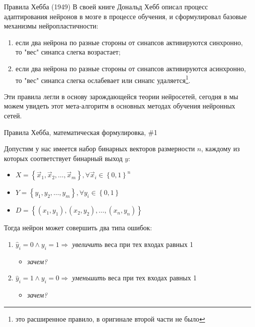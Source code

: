 \documentclass[10pt]{beamer}
\begin{document}
\begin{frame}{Правила Хебба (1949)}
В своей книге Дональд Хебб описал процесс адаптирования нейронов в мозге в процессе обучения, и сформулировал базовые механизмы нейропластичности:
\begin{enumerate}
	\item если два нейрона по разные стороны от синапсов активируются синхронно, то "вес" синапса слегка возрастает;
	\item если два нейрона по разные стороны от синапсов активируются асинхронно, то "вес" синапса слегка ослабевает или синапс удаляется\footnote{это расширенное правило, в оригинале второй части не было}.
\end{enumerate}
Эти правила легли в основу зарождающейся теории нейросетей, сегодня в мы можем увидеть этот мета-алгоритм в основных методах обучения нейронных сетей.

\end{frame}


\begin{frame}{Правила Хебба, математическая формулировка, \#1}

Допустим у нас имеется набор бинарных векторов размерности $n$, каждому из которых соответствует бинарный выход $y$:
\begin{itemize}
	\item $X = \left\{\vec x_1, \vec x_2, \ldots, \vec x_m\right\}, \forall \vec x_i \in \left\{0, 1\right\}^n$
	\item $Y = \left\{y_1, y_2, \ldots, y_m\right\}, \forall y_i \in \left\{0, 1\right\}$
	\item $D = \left\{ \left(x_1, y_1\right), \left(x_2, y_2\right), \ldots, \left(x_n, y_n\right) \right\}$
\end{itemize}
Тогда нейрон может совершить два типа ошибок:
\begin{enumerate}
	\item $\hat y_i = 0 \wedge y_i = 1 \Rightarrow $ \textit{увеличить} веса при тех входах равных 1
	\begin{itemize}
		\item \textit{зачем?}
	\end{itemize}
	\item $\hat y_i = 1 \wedge y_i = 0 \Rightarrow $ \textit{уменьшить} веса при тех входах равных 1
	\begin{itemize}
		\item \textit{зачем?}
	\end{itemize}
\end{enumerate}


\end{frame}
\end{document}
